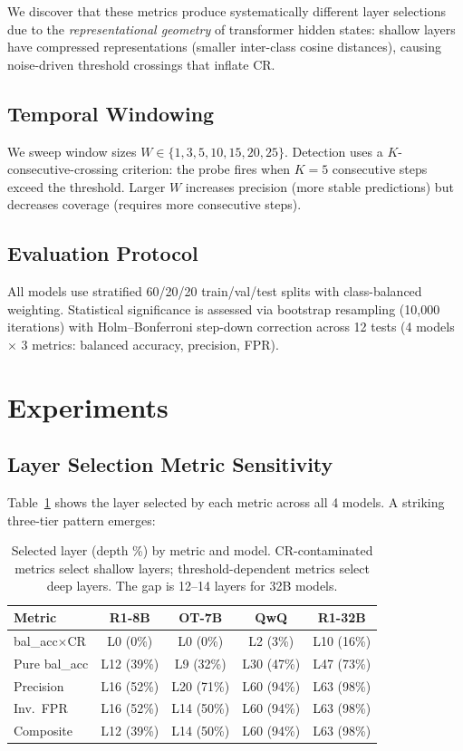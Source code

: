 \documentclass[11pt]{article}
\begin{document}
We discover that these metrics produce systematically different layer selections due to the \emph{representational geometry} of transformer hidden states: shallow layers have compressed representations (smaller inter-class cosine distances), causing noise-driven threshold crossings that inflate CR.

\subsection{Temporal Windowing}

We sweep window sizes $W \in \{1, 3, 5, 10, 15, 20, 25\}$.
Detection uses a $K$-consecutive-crossing criterion: the probe fires when $K{=}5$ consecutive steps exceed the threshold.
Larger $W$ increases precision (more stable predictions) but decreases coverage (requires more consecutive steps).

\subsection{Evaluation Protocol}

All models use stratified 60/20/20 train/val/test splits with class-balanced weighting.
Statistical significance is assessed via bootstrap resampling (10{,}000 iterations) with Holm--Bonferroni step-down correction across 12 tests (4 models $\times$ 3 metrics: balanced accuracy, precision, FPR).


\section{Experiments}

\subsection{Layer Selection Metric Sensitivity}
\label{sec:exp-layer}

Table~\ref{tab:layer-metric} shows the layer selected by each metric across all 4 models.
A striking three-tier pattern emerges:

\begin{table}[t]
\centering
\small
\begin{tabular}{@{}lcccc@{}}
\toprule
\textbf{Metric} & \textbf{R1-8B} & \textbf{OT-7B} & \textbf{QwQ} & \textbf{R1-32B} \\
\midrule
bal\_acc$\times$CR & L0 (0\%) & L0 (0\%) & L2 (3\%) & L10 (16\%) \\
Pure bal\_acc & L12 (39\%) & L9 (32\%) & L30 (47\%) & L47 (73\%) \\
Precision & L16 (52\%) & L20 (71\%) & L60 (94\%) & L63 (98\%) \\
Inv.\ FPR & L16 (52\%) & L14 (50\%) & L60 (94\%) & L63 (98\%) \\
Composite & L12 (39\%) & L14 (50\%) & L60 (94\%) & L63 (98\%) \\
\bottomrule
\end{tabular}
\caption{Selected layer (depth \%) by metric and model. CR-contaminated metrics select shallow layers; threshold-dependent metrics select deep layers. The gap is 12--14 layers for 32B models.}
\label{tab:layer-metric}
\end{table}
\end{document}
